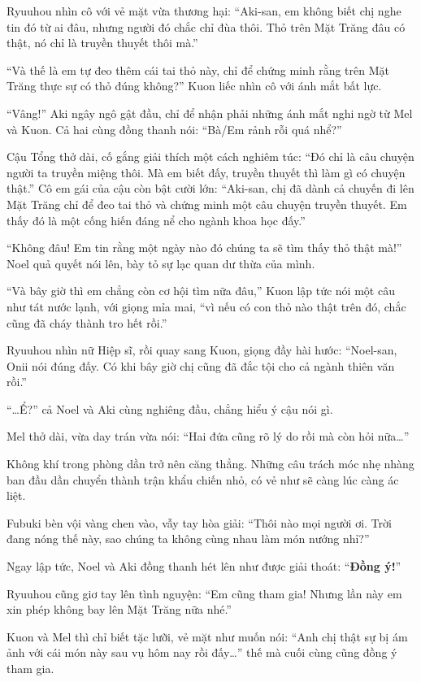 \documentclass[../main.tex]{subfiles}
\begin{document}
Ryuuhou nhìn cô với vẻ mặt vừa thương hại: ``Aki-san, em không biết chị nghe tin đó từ ai đâu, nhưng người đó chắc chỉ đùa thôi. Thỏ trên Mặt Trăng đâu có thật, nó chỉ là truyền thuyết thôi mà.''

``Và thế là em tự đeo thêm cái tai thỏ này, chỉ để chứng minh rằng trên Mặt Trăng thực sự có thỏ đúng không?'' Kuon liếc nhìn cô với ánh mắt bất lực.

``Vâng!'' Aki ngây ngô gật đầu, chỉ để nhận phải những ánh mắt nghi ngờ từ Mel và Kuon. Cả hai cùng đồng thanh nói: ``Bà/Em rảnh rỗi quá nhể?''

Cậu Tổng thở dài, cố gắng giải thích một cách nghiêm túc: ``Đó chỉ là câu chuyện người ta truyền miệng thôi. Mà em biết đấy, truyền thuyết thì làm gì có chuyện thật.'' Cô em gái của cậu còn bật cười lớn: ``Aki-san, chị đã dành cả chuyến đi lên Mặt Trăng chỉ để đeo tai thỏ và chứng minh một câu chuyện truyền thuyết. Em thấy đó là một cống hiến đáng nể cho ngành khoa học đấy.''

``Không đâu! Em tin rằng một ngày nào đó chúng ta sẽ tìm thấy thỏ thật mà!'' Noel quả quyết nói lên, bày tỏ sự lạc quan dư thừa của mình.

``Và bây giờ thì em chẳng còn cơ hội tìm nữa đâu,'' Kuon lập tức nói một câu như tát nước lạnh, với giọng mỉa mai, ``vì nếu có con thỏ nào thật trên đó, chắc cũng đã cháy thành tro hết rồi.''

Ryuuhou nhìn nữ Hiệp sĩ, rồi quay sang Kuon, giọng đầy hài hước: ``Noel-san, Onii nói đúng đấy. Có khi bây giờ chị cũng đã đắc tội cho cả ngành thiên văn rồi.''

``\dots Ể?'' cả Noel và Aki cùng nghiêng đầu, chẳng hiểu ý cậu nói gì.

Mel thở dài, vừa day trán vừa nói: ``Hai đứa cũng rõ lý do rồi mà còn hỏi nữa\dots''

Không khí trong phòng dần trở nên căng thẳng. Những câu trách móc nhẹ nhàng ban đầu dần chuyển thành trận khẩu chiến nhỏ, có vẻ như sẽ càng lúc càng ác liệt.

Fubuki bèn vội vàng chen vào, vẫy tay hòa giải: ``Thôi nào mọi người ơi. Trời đang nóng thế này, sao chúng ta không cùng nhau làm món nướng nhỉ?''

Ngay lập tức, Noel và Aki đồng thanh hét lên như được giải thoát: ``\textbf{Đồng ý!}''

Ryuuhou cũng giơ tay lên tình nguyện: ``Em cũng tham gia! Nhưng lần này em xin phép không bay lên Mặt Trăng nữa nhé.''

Kuon và Mel thì chỉ biết tặc lưỡi, vẻ mặt như muốn nói: ``Anh chị thật sự bị ám ảnh với cái món này sau vụ hôm nay rồi đấy\dots'' thế mà cuối cùng cũng đồng ý tham gia.
\end{document}

